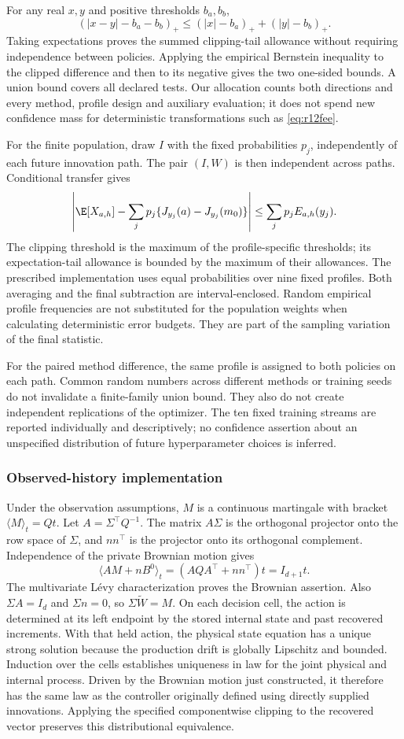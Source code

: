For any real $x,y$ and positive thresholds $b_a,b_b$,
\[
 (|x-y|-b_a-b_b)_+
       \leq (|x|-b_a)_++(|y|-b_b)_+.
\]
Taking expectations proves the summed clipping-tail allowance without requiring independence between policies. Applying the empirical Bernstein inequality to the clipped difference and then to its negative gives the two one-sided bounds. A union bound covers all declared tests. Our allocation counts both directions and every method, profile design and auxiliary evaluation; it does not spend new confidence mass for deterministic transformations such as \eqref{eq:r12fee}.

For the finite population, draw $I$ with the fixed probabilities $p_j$, independently of each future innovation path. The pair $(I,W)$ is then independent across paths. Conditional transfer gives
\[
 \left|\E[X_{a,h}]-\sum_jp_j\{J_{y_j}(a)-J_{y_j}(m_0)\}\right|
       \leq\sum_jp_j E_{a,h}(y_j).
\]
The clipping threshold is the maximum of the profile-specific thresholds; its expectation-tail allowance is bounded by the maximum of their allowances. The prescribed implementation uses equal probabilities over nine fixed profiles. Both averaging and the final subtraction are interval-enclosed. Random empirical profile frequencies are not substituted for the population weights when calculating deterministic error budgets. They are part of the sampling variation of the final statistic.

For the paired method difference, the same profile is assigned to both policies on each path. Common random numbers across different methods or training seeds do not invalidate a finite-family union bound. They also do not create independent replications of the optimizer. The ten fixed training streams are reported individually and descriptively; no confidence assertion about an unspecified distribution of future hyperparameter choices is inferred.

\subsubsection{Observed-history implementation}
Under the observation assumptions, $M$ is a continuous martingale with bracket $\langle M\rangle_t=Qt$. Let $A=\Sigma^\top Q^{-1}$. The matrix $A\Sigma$ is the orthogonal projector onto the row space of $\Sigma$, and $nn^\top$ is the projector onto its orthogonal complement. Independence of the private Brownian motion gives
\[
 \langle AM+nB^0\rangle_t
       =(AQA^\top+nn^\top)t=I_{d+1}t.
\]
The multivariate L\'evy characterization proves the Brownian assertion. Also $\Sigma A=I_d$ and $\Sigma n=0$, so $\Sigma\widetilde W=M$. On each decision cell, the action is determined at its left endpoint by the stored internal state and past recovered increments. With that held action, the physical state equation has a unique strong solution because the production drift is globally Lipschitz and bounded. Induction over the cells establishes uniqueness in law for the joint physical and internal process. Driven by the Brownian motion just constructed, it therefore has the same law as the controller originally defined using directly supplied innovations. Applying the specified componentwise clipping to the recovered vector preserves this distributional equivalence.

